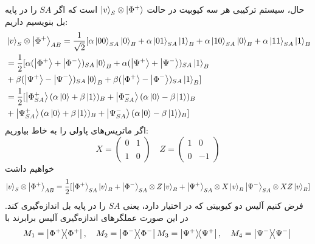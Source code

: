 حال، سیستم ترکیبی هر سه کیوبیت در حالت $\ket{v}_{S} \otimes \ket{\Phi^{+}}$ است که اگر $SA$ را در پایه بل بنویسیم داریم: 
\begin{equation}
\begin{split}
	& \ket{v}_{S} \otimes \ket{\Phi^{+}}_{AB} = \frac{1}{\sqrt{2}}[ \alpha\ket{00}_{SA}\ket{0}_{B} + \alpha\ket{01}_{SA}\ket{1}_{B} + \alpha\ket{10}_{SA}\ket{0}_{B} + \alpha\ket{11}_{SA}\ket{1}_{B} \\
	& = \frac{1}{2} [\alpha(\ket{\Phi^{+}} + \ket{\Phi^{-}})_{SA}\ket{0}_{B} + \alpha(\ket{\Psi^{+}} + \ket{\Psi^{-}})_{SA}\ket{1}_{B} \\ 
	& + \beta(\ket{\Psi^{+}} - \ket{\Psi^{-}})_{SA}\ket{0}_{B} + \beta(\ket{\Phi^{+}} - \ket{\Phi^{-}})_{SA}\ket{1}_{B}] 
	\\ & = \frac{1}{2} [ \ket{\Phi^{+}_{SA}}(\alpha\ket{0} + \beta\ket{1})_{B} + \ket{\Phi^{-}_{SA}}(\alpha\ket{0} - \beta\ket{1})_{B} \\ 
	& + \ket{\Psi^{+}_{SA}}(\alpha\ket{0} + \beta\ket{1})_{B} + \ket{\Psi^{-}_{SA}}(\alpha\ket{0} - \beta\ket{1})_{B}
	]
	\end{split}
\end{equation}
اگر ماتریس‌های پاولی را به خاط بیاوریم:
 \begin{equation}
 	X = \begin{pmatrix} 0 & 1 \\ \\ 1 & 0 \end{pmatrix} \quad Z = \begin{pmatrix} 1 & 0 \\ \\ 0 & -1 \end{pmatrix}
 \end{equation}
  خواهیم داشت
  \begin{equation}
  \ket{v}_{S} \otimes \ket{\Phi^{+}}_{AB} = \frac{1}{2} [\ket{\Phi^{+}}_{SA}\ket{v}_{B} + \ket{\Phi^{-}}_{SA}\otimes Z\ket{v}_{B} +  \ket{\Psi^{+}}_{SA}\otimes X\ket{v}_{B} \ket{\Psi^{-}}_{SA}\otimes XZ\ket{v}_{B}]
  \end{equation}
  فرض کنیم آلیس دو کیوبیتی که در اختیار دارد، یعنی $SA$ را در پایه بل اندازه‌گیری کند. در این صورت عملگرهای اندازه‌گیری آلیس برابرند با
  \begin{equation}
  	M_{1} = \dyad{\Phi^{+}}{\Phi^{+}}, \quad M_{2} = \dyad{\Phi^{-}}{\Phi^{-}} \\
  	M_{3} = \dyad{\Psi^{+}}{\Psi^{+}}, \quad M_{4} = \dyad{\Psi^{-}}{\Psi^{-}} \\
  \end{equation}
  
